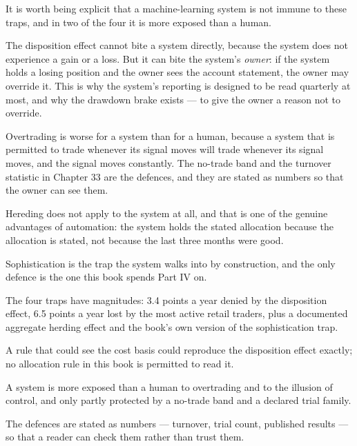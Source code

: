 It is worth being explicit that a machine-learning system is not immune to
these traps, and in two of the four it is more exposed than a human.

The disposition effect cannot bite a system directly, because the system
does not experience a gain or a loss. But it can bite the system's
\emph{owner}: if the system holds a losing position and the owner sees the
account statement, the owner may override it. This is why the system's
reporting is designed to be read quarterly at most, and why the drawdown
brake exists --- to give the owner a reason not to override.

Overtrading is worse for a system than for a human, because a system that
is permitted to trade whenever its signal moves will trade whenever its
signal moves, and the signal moves constantly. The no-trade band and the
turnover statistic in Chapter 33 are the defences, and they are stated as
numbers so that the owner can see them.

Hereding does not apply to the system at all, and that is one of the
genuine advantages of automation: the system holds the stated allocation
because the allocation is stated, not because the last three months were
good.

Sophistication is the trap the system walks into by construction, and the
only defence is the one this book spends Part IV on.

\begin{keytakeaways}
\item The four traps have magnitudes: 3.4 points a year denied by the
disposition effect, 6.5 points a year lost by the most active retail
traders, plus a documented aggregate herding effect and the book's own
version of the sophistication trap.
\item A rule that could see the cost basis could reproduce the disposition
effect exactly; no allocation rule in this book is permitted to read it.
\item A system is more exposed than a human to overtrading and to the
illusion of control, and only partly protected by a no-trade band and a
declared trial family.
\item The defences are stated as numbers --- turnover, trial count,
published results --- so that a reader can check them rather than trust
them.
\end{keytakeaways}
